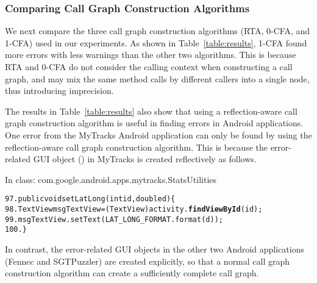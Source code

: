 \subsubsection{Comparing Call Graph Construction Algorithms}
\label{sec:reflectionaware}

We next compare the three call graph construction algorithms (RTA, 0-CFA, and 1-CFA)
used in our experiments. As shown in Table~\ref{table:results},  1-CFA found
more errors with less warnings than the other two algorithms. This
is because RTA and 0-CFA do not consider the calling context when
constructing a call graph, and may
mix the same method calls by different callers into a single node, thus
introducing imprecision. 


The results in Table~\ref{table:results} also show that using a reflection-aware
call graph construction algorithm is useful in finding errors in Android
applications. One error from the MyTracks Android application
can only be found by using the reflection-aware call graph construction algorithm.
This is because the error-related GUI object () in MyTracks is created
reflectively as follows.

{\vspace{2mm}
\hspace{3mm}\small{In class: com.google.android.apps.mytracks.StatsUtilities}
\vspace{-2mm}
\begin{CodeOut}
\begin{alltt}
97.  public void setLatLong(int id, double d) \{
98.     TextView msgTextView = (TextView) activity.\textbf{findViewById}(id);
99.     msgTextView.setText(LAT\_LONG\_FORMAT.format(d));
100. \}
\end{alltt}
\end{CodeOut}}

 
In contrast, the error-related GUI objects in the other two Android applications (Fennec
and SGTPuzzler) are created explicitly, so that a normal call graph construction
algorithm can create a sufficiently complete call graph.


